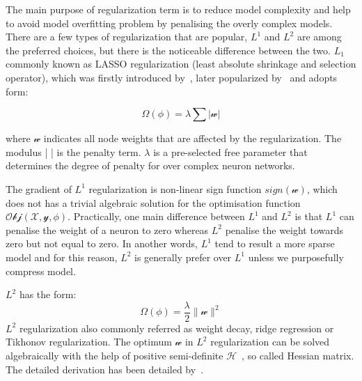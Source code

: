 
The main purpose of regularization term is to reduce model complexity and help to avoid model overfitting problem by penalising the overly complex models. There are a few types of regularization that are popular, $L^1$ and $L^2$ are among the preferred choices, but there is the noticeable difference between the two. $L_1$ commonly known as LASSO regularization (least absolute shrinkage and selection operator), which was firstly introduced by~\citet{Santosa_1986}, later popularized by~\citet{Tibshirani_1996} and adopts form:

\begin{equation}
   \Omega(\phi) = \lambda \sum | \mathcal{w} |
\end{equation}

where $\mathcal{w}$ indicates all node weights that are affected by the regularization. The modulus |  | is the penalty term. $\lambda$ is a pre-selected free parameter that determines the degree of penalty for over complex neuron networks. 
\par 
The gradient of $L^1$ regularization is non-linear sign function $sign (\mathcal{w})$, which does not has a trivial algebraic solution for the optimisation function $\mathcal{Obj}(\mathcal{X},\mathcal{y},\phi)$. Practically, one main difference between $L^1$ and $L^2$ is that $L^1$ can penalise the weight of a neuron to zero whereas $L^2$ penalise the weight towards zero but not equal to zero. In another words, $L^1$ tend to result a more sparse model and for this reason, $L^2$ is generally prefer over $L^1$ unless we purposefully compress model.

$L^2$ has the form:
\begin{equation}
   \Omega(\phi) = \frac{\lambda}{2} \parallel \mathcal{w} \parallel^2
\end{equation}
$L^2$ regularization also commonly referred as weight decay, ridge regression or Tikhonov regularization. The optimum $\mathcal{w}$ in $L^2$ regularization can be solved algebraically with the help of positive semi-definite $\mathcal{H}$~\cite{Goodfellow-et-al-2016}, so called Hessian matrix. The detailed derivation has been detailed by~\citet{Goodfellow-et-al-2016}.